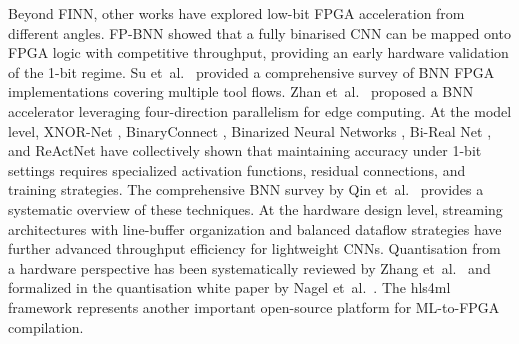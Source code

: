 \documentclass[12pt, a4paper]{report}
\numberwithin{equation}{chapter}
\numberwithin{figure}{chapter}
\numberwithin{table}{chapter}
\numberwithin{algorithm}{chapter}
\begin{document}
Beyond FINN, other works have explored low-bit FPGA acceleration from different angles. FP-BNN \cite{Liang2018FPBNN} showed that a fully binarised CNN can be mapped onto FPGA logic with competitive throughput, providing an early hardware validation of the 1-bit regime. Su et~al.~\cite{Su2023BNNFPGASurvey} provided a comprehensive survey of BNN FPGA implementations covering multiple tool flows. Zhan et~al.~\cite{Zhan2023BNNEdge} proposed a BNN accelerator leveraging four-direction parallelism for edge computing. At the model level, XNOR-Net \cite{Rastegari2016XNOR}, BinaryConnect \cite{Courbariaux2016BinaryConnect}, Binarized Neural Networks \cite{Hubara2016BinarizedNN}, Bi-Real Net \cite{Liu2018BiReal}, and ReActNet \cite{Liu2020ReActNet} have collectively shown that maintaining accuracy under 1-bit settings requires specialized activation functions, residual connections, and training strategies. The comprehensive BNN survey by Qin et~al.~\cite{Qin2020BNNSurvey} provides a systematic overview of these techniques. At the hardware design level, streaming architectures with line-buffer organization \cite{Kang2023AoCStream} and balanced dataflow strategies \cite{Zhao2024HighThroughput} have further advanced throughput efficiency for lightweight CNNs. Quantisation from a hardware perspective has been systematically reviewed by Zhang et~al.~\cite{Fouda2025QuantCNNHW} and formalized in the quantisation white paper by Nagel et~al.~\cite{Nagel2021QuantWhitepaper}. The hls4ml framework \cite{Schulte2025hls4ml} represents another important open-source platform for ML-to-FPGA compilation.
\end{document}
